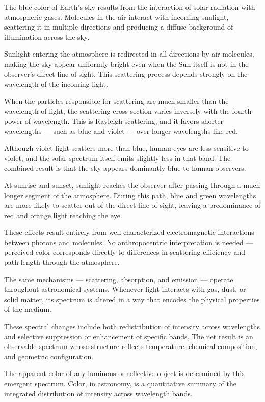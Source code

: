 The blue color of Earth's sky results from the interaction of solar radiation with atmospheric gases. Molecules in the air interact with incoming sunlight, scattering it in multiple directions and producing a diffuse background of illumination across the sky.

Sunlight entering the atmosphere is redirected in all directions by air molecules, making the sky appear uniformly bright even when the Sun itself is not in the observer’s direct line of sight. This scattering process depends strongly on the wavelength of the incoming light.

When the particles responsible for scattering are much smaller than the wavelength of light, the scattering cross-section varies inversely with the fourth power of wavelength. This is Rayleigh scattering, and it favors shorter wavelengths — such as blue and violet — over longer wavelengths like red.

Although violet light scatters more than blue, human eyes are less sensitive to violet, and the solar spectrum itself emits slightly less in that band. The combined result is that the sky appears dominantly blue to human observers.

At sunrise and sunset, sunlight reaches the observer after passing through a much longer segment of the atmosphere. During this path, blue and green wavelengths are more likely to scatter out of the direct line of sight, leaving a predominance of red and orange light reaching the eye.

These effects result entirely from well-characterized electromagnetic interactions between photons and molecules. No anthropocentric interpretation is needed — perceived color corresponds directly to differences in scattering efficiency and path length through the atmosphere.

The same mechanisms — scattering, absorption, and emission — operate throughout astronomical systems. Whenever light interacts with gas, dust, or solid matter, its spectrum is altered in a way that encodes the physical properties of the medium.

These spectral changes include both redistribution of intensity across wavelengths and selective suppression or enhancement of specific bands. The net result is an observable spectrum whose structure reflects temperature, chemical composition, and geometric configuration.

The apparent color of any luminous or reflective object is determined by this emergent spectrum. Color, in astronomy, is a quantitative summary of the integrated distribution of intensity across wavelength bands.


